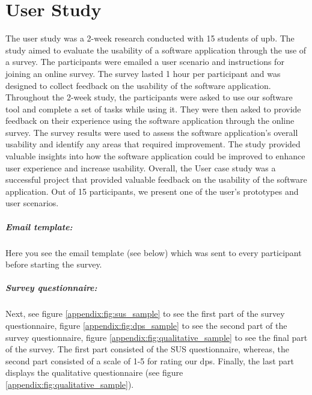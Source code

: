 \chapter{User Study}
\label{appendix:three:caseStudy}

\ifpdf
    \graphicspath{{Appendix3/Figs/}{Appendix3/Figs/}{Appendix3/Figs/}}
\else
    \graphicspath{{Appendix3/Figs/}{Appendix3/Figs/}}
\fi

The user study was a 2-week research conducted with 15 students of \ac{upb}. 
The study aimed to evaluate the usability of a software application through the use of a survey.
The participants were emailed a user scenario and instructions for joining an online survey. 
The survey lasted 1 hour per participant and was designed to collect feedback on the usability of the software application.
Throughout the 2-week study, the participants were asked to use our software tool and complete a set of tasks while using it. 
They were then asked to provide feedback on their experience using the software application through the online survey.
The survey results were used to assess the software application's overall usability and identify any areas that required improvement. 
The study provided valuable insights into how the software application could be improved to enhance user experience and increase usability. 
Overall, the User case study was a successful project that provided valuable feedback on the usability of the software application.
Out of 15 participants, we present one of the user's prototypes and user scenarios.

\paragraph{Email template:} Here you see the email template (see below) which was sent to every participant before starting the survey.

\paragraph{Survey questionnaire:} 
Next, see figure \ref{appendix:fig:sus_sample} to see the first part of the survey questionnaire, figure \ref{appendix:fig:dps_sample} to see the second part of the survey questionnaire, figure \ref{appendix:fig:qualitative_sample} to see the final part of the survey.
The first part consisted of the SUS questionnaire, whereas, the second part consisted of a scale of 1-5 for rating our \ac{dp}s.
Finally, the last part displays the qualitative questionnaire (see figure \ref{appendix:fig:qualitative_sample}).

